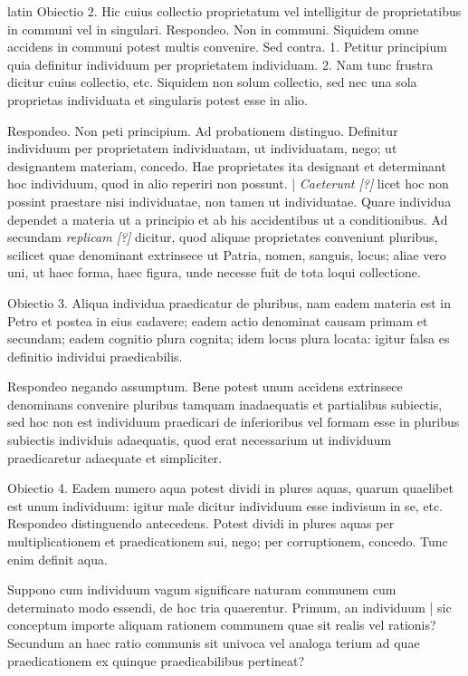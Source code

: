 \begin{otherlanguage*}{latin}
\pstart
Obiectio 2. Hic cuius collectio proprietatum vel intelligitur de proprietatibus in communi vel in singulari. Respondeo. Non in communi. Siquidem omne accidens in communi potest multis convenire. Sed contra. 1. Petitur principium quia definitur individuum per proprietatem individuam. 2. Nam tunc frustra dicitur cuius collectio, etc. Siquidem non solum collectio, sed nec una sola proprietas individuata et singularis potest esse in alio. 
\pend

\pstart
Respondeo. Non peti principium. Ad probationem distinguo. Definitur individuum per proprietatem individuatam, ut individuatam, nego; ut designantem materiam, concedo. Hae proprietates ita designant et determinant hoc individuum, quod in alio reperiri non possunt. \textnormal{|} \emph{Caeterunt [?]} licet hoc non possint praestare nisi individuatae, non tamen ut individuatae. Quare individua dependet a materia ut a principio et ab his accidentibus ut a conditionibus. Ad secundam \emph{replicam [?]} dicitur, quod aliquae proprietates conveniunt pluribus, scilicet quae denominant extrinsece ut Patria, nomen, sanguis, locus; aliae vero uni, ut haec forma, haec figura, unde necesse fuit de tota loqui collectione. 
\pend

\pstart
Obiectio 3. Aliqua individua praedicatur de pluribus, nam eadem materia est in Petro et postea in eius cadavere; eadem actio denominat causam primam et secundam; eadem cognitio plura cognita; idem locus plura locata:
igitur falsa es definitio individui praedicabilis. 
\pend

\pstart
Respondeo negando assumptum. Bene potest unum accidens extrinsece denominans convenire pluribus tamquam inadaequatis et partialibus subiectis, sed hoc non est individuum praedicari de inferioribus vel formam esse in pluribus subiectis individuis adaequatis, quod erat necessarium ut individuum praedicaretur adaequate et simpliciter. 
\pend

\pstart
Obiectio 4. Eadem numero aqua potest dividi in plures aquas, quarum quaelibet est unum individuum:
igitur male dicitur individuum esse indivisum in se, etc. Respondeo distinguendo antecedens. Potest dividi in plures aquas per multiplicationem et praedicationem sui, nego; per corruptionem, concedo. Tunc enim definit aqua. 
\pend

\pstart
{}
\pend

\pstart
Suppono cum  individuum vagum significare naturam communem cum determinato modo essendi, de hoc tria quaerentur. Primum, an individuum \textnormal{|} sic conceptum importe aliquam rationem communem quae sit realis vel rationis? Secundum an haec ratio communis sit univoca vel analoga terium ad quae praedicationem ex quinque praedicabilibus pertineat? 
\pend


\end{otherlanguage*}
